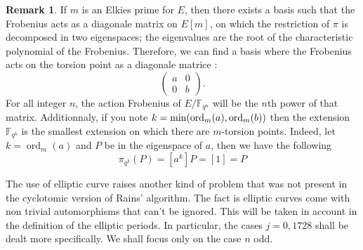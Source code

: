 \documentclass[12pt]{article}
\theoremstyle{plain}
\theoremstyle{definition}
\newtheorem*{remark}{Remark}
\DeclareMathOperator{\order}{ord} %
\def\F{\ensuremath{\mathbb{F}}}
\newcounter{algorithm}
\begin{document}
\begin{remark}
If $m$ is an Elkies prime for $E$, then there exists a basis such that the 
Frobenius acts as a diagonale matrix on $E[m]$, on which the restriction of
$\pi$ is decomposed in two eigenspaces; the eigenvalues are the root of the 
characteristic polynomial of the Frobenius. Therefore, we can find a basis where
the Frobenius acts on the torsion point as a diagonale matrice :
\begin{equation}
\begin{pmatrix}
a & 0\\
0 & b
\end{pmatrix}.
\end{equation}
For all integer $n$, the action Frobenius of $E/\F_{q^n}$ will be the $n$th
power of that matrix. Additionnaly, if you note $k =
\textup{min}(\order_m(a),\order_m(b))$ then the extension $\F_{q^k}$ is
the smallest extension on which there are $m$-torsion points. Indeed, let $k = 
\order_m(a)$ and $P$ be in the eigenspace of $a$, then we have the following
\begin{equation}
\pi_{q^k}(P) = [a^k]P = [1] = P
\end{equation}
\end{remark}

The use of elliptic curve raises another kind of problem that was not present 
in the cyclotomic version of Rains' algorithm. The fact is elliptic curves 
come with non trivial automorphisms that can't be ignored. This will be taken 
in account in the definition of the elliptic periods. In particular, the cases 
$j = 0, 1728$ shall be dealt more specifically. We shall focus only on the case
$n$ odd.
\end{document}
